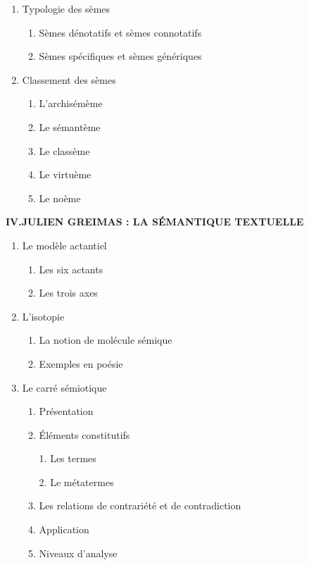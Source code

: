 \begin{keybox}
\begin{enumerate}[label=\arabic*.]
\begin{enumerate}[label=\textcircled{\scriptsize\arabic*}]
\end{enumerate}
\item Typologie des sèmes
\begin{enumerate}[label=\textcircled{\scriptsize\arabic*}]
\item Sèmes dénotatifs et sèmes connotatifs
\item Sèmes spécifiques et sèmes génériques
\end{enumerate}
\item Classement des sèmes
\begin{enumerate}[label=\textcircled{\scriptsize\arabic*}]
\item L’archisémème
\item Le sémantème
\item Le classème
\item Le virtuème
\item Le noème
\end{enumerate}
\end{enumerate}
\tcbbreak
{}
\textbf{IV.\quad JULIEN GREIMAS : LA SÉMANTIQUE TEXTUELLE}
\begin{enumerate}[label=\arabic*.]
\item Le modèle actantiel
\begin{enumerate}[label=\textcircled{\scriptsize\arabic*}]
\item Les six actants
\item Les trois axes
\end{enumerate}
\item L’isotopie
\begin{enumerate}[label=\textcircled{\scriptsize\arabic*}]
\item La notion de molécule sémique
\item Exemples en poésie
\end{enumerate}
\item Le carré sémiotique
\begin{enumerate}[label=\textcircled{\scriptsize\arabic*}]
\item Présentation
\item Éléments constitutifs\par 1. Les termes\par 2. Le métatermes
\item Les relations de contrariété et de contradiction
\item Application
\item Niveaux d’analyse
\end{enumerate}

\end{enumerate}
\end{keybox}
